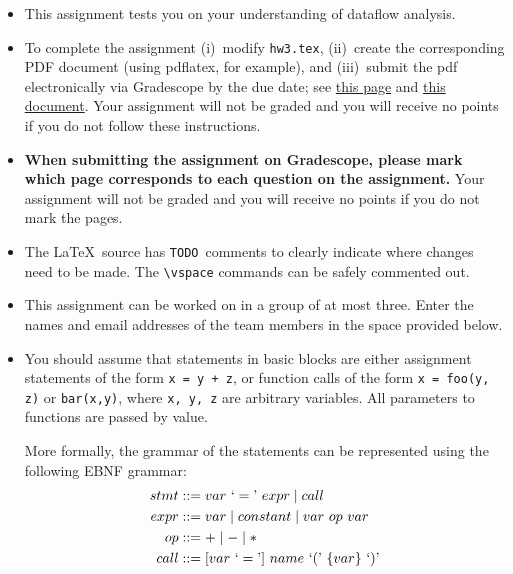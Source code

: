 \documentclass[12pt]{article}
\begin{document}
    \begin{itemize}
      \item This assignment tests you on your understanding of dataflow analysis.
      \item To complete the assignment (i)~modify \texttt{hw3.tex}, (ii)~create
      the corresponding PDF document (using pdflatex, for example), and
      (iii)~submit the pdf electronically via Gradescope by the due date; see
      \href{https://www.gradescope.com/get_started#student-submission}{this page}
      and
      \href{http://gradescope-static-assets.s3-us-west-2.amazonaws.com/help/submitting_hw_guide.pdf}{this
      document}. Your assignment will not be graded and you will receive no
      points if you do not follow these instructions. 

      \item \textbf{When submitting the assignment on Gradescope, please mark
      which page corresponds to each question on the assignment.}  Your
      assignment will not be graded and you will receive no points if you do not
      mark the pages.      

      \item The  \LaTeX\ source has \texttt{TODO}~comments to clearly indicate
      where changes need to be made. 
      The \verb=\vspace= commands can be safely commented out.
      \item This assignment can be worked on in a group of at most three. Enter
      the names and email addresses of the team members in the space provided
      below.
      \item You should assume that statements in basic blocks are either
            assignment statements of the form \lstinline$x = y + z$, or function
            calls of the form \lstinline$x = foo(y, z)$ or \lstinline$bar(x,y)$, where \lstinline$x, y, z$ 
            are arbitrary variables. All
            parameters to functions are passed by value.

            More formally, the grammar of the statements can be represented using the following EBNF grammar:
            \begin{align*}
            stmt &::= var\ `=\textrm'\ expr  \mid call \\
            expr &::= var \mid constant \mid var\ op\ var  \\
            op &::= + \mid - \mid *  \\
            call &::= [var\ `=\textrm' ]\ name\ `(\textrm'\ \{var\}\ `)\textrm' 
            \end{align*}
    \end{itemize}
\end{document}
